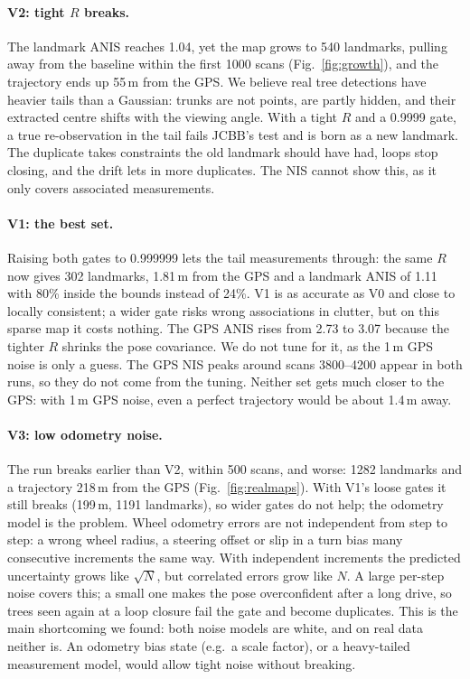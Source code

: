 \documentclass[11pt,a4paper]{article}
\newcommand{\figref}[1]{Fig.~\ref{#1}}
\begin{document}
\paragraph{V2: tight \(R\) breaks.} The landmark ANIS reaches 1.04, yet the map grows to 540 landmarks, pulling away from the baseline within the first 1000 scans (\figref{fig:growth}), and the trajectory ends up 55\,m from the GPS. We believe real tree detections have heavier tails than a Gaussian: trunks are not points, are partly hidden, and their extracted centre shifts with the viewing angle. With a tight \(R\) and a 0.9999 gate, a true re-observation in the tail fails JCBB's test and is born as a new landmark. The duplicate takes constraints the old landmark should have had, loops stop closing, and the drift lets in more duplicates. The NIS cannot show this, as it only covers associated measurements.

\paragraph{V1: the best set.} Raising both gates to 0.999999 lets the tail measurements through: the same \(R\) now gives 302 landmarks, 1.81\,m from the GPS and a landmark ANIS of 1.11 with 80\% inside the bounds instead of 24\%. V1 is as accurate as V0 and close to locally consistent; a wider gate risks wrong associations in clutter, but on this sparse map it costs nothing. The GPS ANIS rises from 2.73 to 3.07 because the tighter \(R\) shrinks the pose covariance. We do not tune for it, as the 1\,m GPS noise is only a guess. The GPS NIS peaks around scans 3800--4200 appear in both runs, so they do not come from the tuning. Neither set gets much closer to the GPS: with 1\,m GPS noise, even a perfect trajectory would be about 1.4\,m away.

\paragraph{V3: low odometry noise.} The run breaks earlier than V2, within 500 scans, and worse: 1282 landmarks and a trajectory 218\,m from the GPS (\figref{fig:realmaps}). With V1's loose gates it still breaks (199\,m, 1191 landmarks), so wider gates do not help; the odometry model is the problem. Wheel odometry errors are not independent from step to step: a wrong wheel radius, a steering offset or slip in a turn bias many consecutive increments the same way. With independent increments the predicted uncertainty grows like \(\sqrt{N}\), but correlated errors grow like \(N\). A large per-step noise covers this; a small one makes the pose overconfident after a long drive, so trees seen again at a loop closure fail the gate and become duplicates. This is the main shortcoming we found: both noise models are white, and on real data neither is. An odometry bias state (e.g.\ a scale factor), or a heavy-tailed measurement model, would allow tight noise without breaking.
\end{document}
